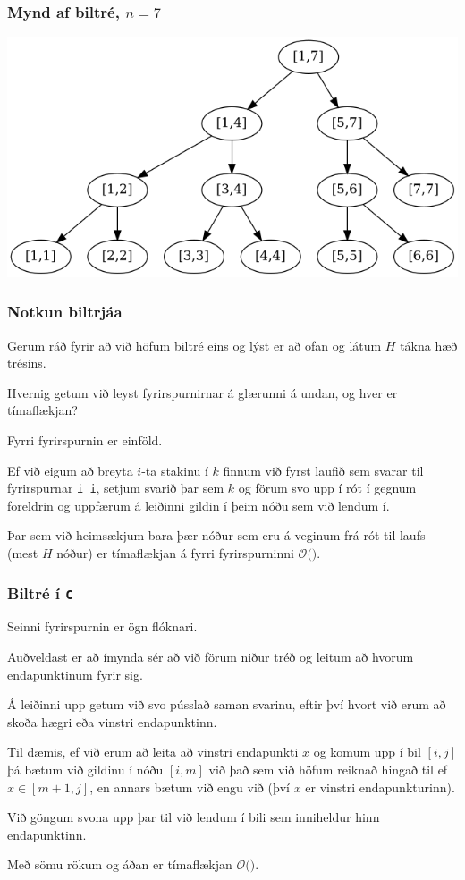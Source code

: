 {
	\frametitle{Mynd af biltré, $n = 7$}
	{
		\includegraphics[scale=0.3]{fig/mynd3.png}
	}
}

{
	\frametitle{Notkun biltrjáa}
	{
		\item<1-> Gerum ráð fyrir að við höfum biltré eins og lýst er að ofan og látum $H$ tákna hæð trésins.
		\item<2-> Hvernig getum við leyst fyrirspurnirnar á glærunni á undan, og hver er tímaflækjan?
		\item<3-> Fyrri fyrirspurnin er einföld.
		\item<4-> Ef við eigum að breyta $i$-ta stakinu í $k$ finnum við fyrst laufið sem svarar til fyrirspurnar \texttt{i i},
					setjum svarið þar sem $k$ og förum svo upp í rót í gegnum foreldrin og uppfærum á leiðinni gildin í þeim nóðu sem við lendum í.
		\item<5-> Þar sem við heimsækjum bara þær nóður sem eru á veginum frá rót til laufs (mest $H$ nóður)
					er tímaflækjan á fyrri fyrirspurninni $\mathcal{O}($\onslide<6->{$\,H\,$}$)$.
	}
}

{
	\frametitle{Biltré í \texttt{C}}
}

{
	{
		\item<1-> Seinni fyrirspurnin er ögn flóknari.
		\item<2-> Auðveldast er að ímynda sér að við förum niður tréð og leitum að hvorum endapunktinum fyrir sig.
		\item<3-> Á leiðinni upp getum við svo pússlað saman svarinu, eftir því hvort við erum að skoða hægri eða vinstri endapunktinn.
		\item<4-> Til dæmis, ef við erum að leita að vinstri endapunkti $x$ og komum upp í bil $[i, j]$ þá bætum við gildinu í nóðu
			$[i, m]$ við það sem við höfum reiknað hingað til ef $x \in [m + 1, j]$, en annars bætum við engu við (því $x$ er vinstri endapunkturinn).
		\item<5-> Við göngum svona upp þar til við lendum í bili sem inniheldur hinn endapunktinn.
		\item<6-> Með sömu rökum og áðan er tímaflækjan $\mathcal{O}($\onslide<7->{$\,H\,$}$)$.
	}
}

